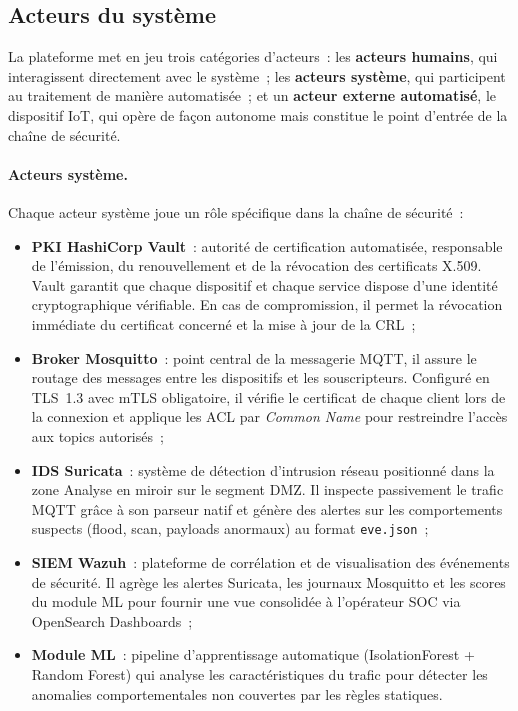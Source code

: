 \subsection{Acteurs du système}

La plateforme met en jeu trois catégories d'acteurs~: les \textbf{acteurs humains}, qui interagissent directement avec le système~; les \textbf{acteurs système}, qui participent au traitement de manière automatisée~; et un \textbf{acteur externe automatisé}, le dispositif IoT, qui opère de façon autonome mais constitue le point d'entrée de la chaîne de sécurité.

\paragraph{Acteurs système.} Chaque acteur système joue un rôle spécifique dans la chaîne de sécurité~:

\begin{itemize}[leftmargin=*]
  \item \textbf{PKI HashiCorp Vault}~: autorité de certification automatisée, responsable de l'émission, du renouvellement et de la révocation des certificats X.509. Vault garantit que chaque dispositif et chaque service dispose d'une identité cryptographique vérifiable. En cas de compromission, il permet la révocation immédiate du certificat concerné et la mise à jour de la CRL~;
  \item \textbf{Broker Mosquitto}~: point central de la messagerie MQTT, il assure le routage des messages entre les dispositifs et les souscripteurs. Configuré en TLS~1.3 avec mTLS obligatoire, il vérifie le certificat de chaque client lors de la connexion et applique les ACL par \emph{Common Name} pour restreindre l'accès aux topics autorisés~;
  \item \textbf{IDS Suricata}~: système de détection d'intrusion réseau positionné dans la zone Analyse en miroir sur le segment DMZ. Il inspecte passivement le trafic MQTT grâce à son parseur natif et génère des alertes sur les comportements suspects (flood, scan, payloads anormaux) au format \texttt{eve.json}~;
  \item \textbf{SIEM Wazuh}~: plateforme de corrélation et de visualisation des événements de sécurité. Il agrège les alertes Suricata, les journaux Mosquitto et les scores du module ML pour fournir une vue consolidée à l'opérateur SOC via OpenSearch Dashboards~;
  \item \textbf{Module ML}~: pipeline d'apprentissage automatique (IsolationForest + Random Forest) qui analyse les caractéristiques du trafic pour détecter les anomalies comportementales non couvertes par les règles statiques.
\end{itemize}

